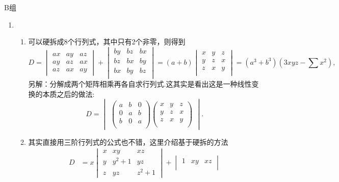 \centerline{\heiti B组}
\begin{enumerate}
    \item \begin{enumerate}
        \item 可以硬拆成8个行列式，其中只有2个非零，则得到
        \[D=\begin{vmatrix}
            ax&ay&az\\
            ay&az&ax\\
            az&ax&ay
            \end{vmatrix}+\begin{vmatrix}
            by&bz&bx\\
            bz&bx&by\\
            bx&by&bz\\
            \end{vmatrix}=(a+b)\begin{vmatrix}
            x&y&z\\
            y&z&x\\
            z&x&y\\
            \end{vmatrix}=(a^3+b^3)(3xyz-\sum x^2),\]
        另解：分解成两个矩阵相乘再各自求行列式.这其实是看出这是一种线性变换的本质之后的做法:
        \[D=\begin{vmatrix}
            \begin{pmatrix}
            a&b&0\\
            0&a&b\\
            b&0&a\\
            \end{pmatrix}
            \begin{pmatrix}
            x&y&z\\
            y&z&x\\
            z&x&y\\
            \end{pmatrix}
            \end{vmatrix}.\]
        \item 其实直接用三阶行列式的公式也不错，这里介绍基于硬拆的方法
        \[
        \begin{aligned}
        D&=x\begin{vmatrix}
        x&xy&xz\\
        y&y^2+1&yz\\
        z&yz&z^2+1
        \end{vmatrix}+\begin{vmatrix}
        1&xy&xz\\

\end{vmatrix}
\end{aligned}\]
\end{enumerate}
\end{enumerate}
